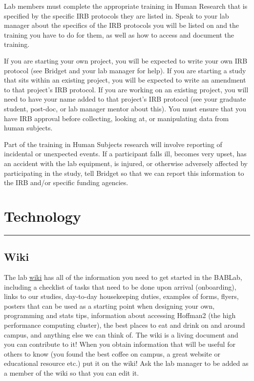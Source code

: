 \documentclass[]{book}
\begin{document}
Lab members must complete the appropriate training in Human Research that is specified by the specific IRB protocols they are listed in. Speak to your lab manager about the specifics of the IRB protocols you will be listed on and the training you have to do for them, as well as how to access and document the training.

If you are starting your own project, you will be expected to write your own IRB protocol (see Bridget and your lab manager for help). If you are starting a study that sits within an existing project, you will be expected to write an amendment to that project's IRB protocol. If you are working on an existing project, you will need to have your name added to that project's IRB protocol (see your graduate student, post-doc, or lab manager mentor about this). You must ensure that you have IRB approval before collecting, looking at, or manipulating data from human subjects.

Part of the training in Human Subjects research will involve reporting of incidental or unexpected events. If a participant falls ill, becomes very upset, has an accident with the lab equipment, is injured, or otherwise adversely affected by participating in the study, tell Bridget so that we can report this information to the IRB and/or specific funding agencies.

\hypertarget{technology}{%
\chapter{Technology}\label{technology}}

\begin{center}\rule{0.5\linewidth}{\linethickness}\end{center}

\hypertarget{wiki}{%
\section{Wiki}\label{wiki}}

The lab \href{https://bab-lab.github.io/bablab/}{wiki} has all of the information you need to get started in the BABLab, including a checklist of tasks that need to be done upon arrival (onboarding), links to our studies, day-to-day housekeeping duties, examples of forms, flyers, posters that can be used as a starting point when designing your own, programming and stats tips, information about accessing Hoffman2 (the high performance computing cluster), the best places to eat and drink on and around campus, and anything else we can think of. The wiki is a living document and you can contribute to it! When you obtain information that will be useful for others to know (you found the best coffee on campus, a great website or educational resource etc.) put it on the wiki! Ask the lab manager to be added as a member of the wiki so that you can edit it.
\end{document}
